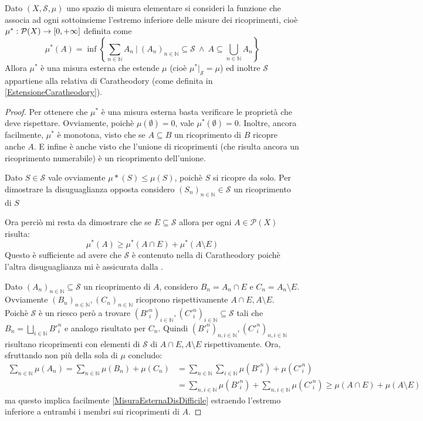 \begin{proposition}\label{MisuraEsternaDiPremisura}
	Dato $(X,\mathcal S,\mu)$ uno spazio di misura elementare si consideri la funzione che associa ad ogni sottoinsieme l'estremo inferiore delle misure dei ricoprimenti, cioè $\mu^*:\mathcal P(X)\to[0,+\infty]$ definita come 
	\begin{equation*}
		\mu^*(A)=\inf\left\{\sum_{n\in\mathbb N} A_n\ |\ (A_n)_{n\in\mathbb N}\subseteq\mathcal S\ \wedge
		\ A\subseteq\bigcup_{n\in\mathbb N}A_n\right\}
	\end{equation*}
	Allora $\mu^*$ è una misura esterna che estende $\mu$ (cioè $\mu^*|_{\mathcal S}=\mu$) ed inoltre $\mathcal S$ appartiene alla relativa \sigalg{} di Caratheodory (come definita in \cref{EstensioneCaratheodory}).
\end{proposition}
\begin{proof}
	Per ottenere che $\mu^*$ è una misura esterna basta verificare le proprietà che deve rispettare.
	Ovviamente, poichè $\mu(\emptyset)=0$, vale $\mu^*(\emptyset)=0$. 
	Inoltre, ancora facilmente, $\mu^*$ è monotona, visto che se $A\subseteq B$ un ricoprimento di $B$ ricopre anche $A$.
	E infine è anche \sigsubadd{} visto che l'unione di ricoprimenti (che risulta ancora un ricoprimento numerabile) è un ricoprimento dell'unione.
	
	Dato $S\in\mathcal S$ vale ovviamente $\mu*(S)\le\mu(S)$, poichè $S$ si ricopre da solo. Per dimostrare la disuguaglianza opposta considero $(S_n)_{n\in\mathbb N}\in \mathcal S$ un ricoprimento di $S$
	
	Ora perciò mi resta da dimostrare che se $E\subseteq \mathcal S$ allora per ogni $A\in\mathcal P(X)$ risulta:
	\begin{equation}\label{MisuraEsternaDisDifficile}
		\mu^*(A) \ge \mu^*(A\cap E)+\mu^*(A\setminus E)
	\end{equation}
	Questo è sufficiente ad avere che $\mathcal S$ è contenuto nella \sigalg{} di Caratheodory poichè l'altra disuguaglianza mi è assicurata dalla \sigsubadd[ità].
	
	Dato $(A_n)_{n\in\mathbb N}\subseteq\mathcal S$ un ricoprimento di $A$, considero $B_n=A_n\cap E$ e $C_n=A_n\setminus E$. Ovviamente $(B_n)_{n\in\mathbb N},(C_n)_{n\in\mathbb N}$ ricoprono rispettivamente $A\cap E,A\setminus E$. Poichè $\mathcal S$ è un \semiring{} riesco però a trovare $(B'^n_i)_{i\in\mathbb N},(C'^n_i)_{i\in\mathbb N} \subseteq \mathcal S$ tali che $B_n=\bigsqcup_{i\in\mathbb N}B'^n_i$ e analogo risultato per $C_n$. Quindi $(B'^n_i)_{n,i\in\mathbb N}, (C'^n_i)_{n,i\in\mathbb N}$ risultano ricoprimenti con elementi di $\mathcal S$ di $A\cap E,A\setminus E$ rispettivamente.
	Ora, sfruttando non più della sola \sigadd[ità] di $\mu$ concludo:
	\begin{align*}
		\sum_{n\in\mathbb N}\mu(A_n)=\sum_{n\in\mathbb N} \mu(B_n)+\mu(C_n)&=
		\sum_{n\in\mathbb N}\sum_{i\in\mathbb N}\mu(B'^n_i)+\mu(C'^n_i)\\
		&=
		\sum_{n,i\in\mathbb N}\mu(B'^n_i)+\sum_{n,i\in\mathbb N}\mu(C'^n_i)\ge \mu(A\cap E)+\mu(A\setminus E)
	\end{align*}
	ma questo implica facilmente \cref{MisuraEsternaDisDifficile} estraendo l'estremo inferiore a entrambi i membri sui ricoprimenti di $A$.
	

\end{proof}
